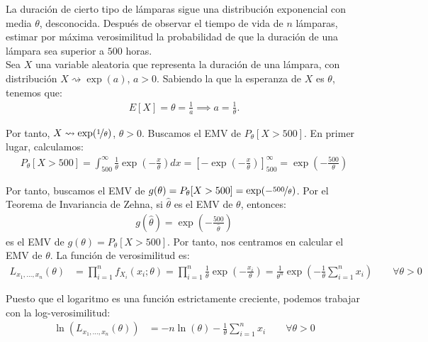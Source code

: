 \begin{ejemplo}
    La duración de cierto tipo de lámparas sigue una distribución exponencial con media $\theta$, desconocida. Después de observar el tiempo de vida de $n$ lámparas, estimar por máxima verosimilitud la probabilidad de que la duración de una lámpara sea superior a $500$ horas.\\

    Sea $X$ una variable aleatoria que representa la duración de una lámpara, con distribución $X \rightsquigarrow \exp(a)$, $a > 0$. Sabiendo la que la esperanza de $X$ es $\theta$, tenemos que:
    \begin{align*}
        E[X] = \theta = \frac{1}{a} \implies a = \frac{1}{\theta}.
    \end{align*}

    Por tanto, $X \rightsquigarrow \exp(\nicefrac{1}{\theta})$, $\theta > 0$. Buscamos el EMV de $P_{\theta}[X > 500]$. En primer lugar, calculamos:
    \begin{align*}
        P_{\theta}[X > 500] = \int_{500}^{\infty} \frac{1}{\theta} \exp\left(-\frac{x}{\theta}\right) dx = \left[-\exp\left(-\frac{x}{\theta}\right)\right]_{500}^{\infty} = \exp\left(-\frac{500}{\theta}\right)
    \end{align*}

    Por tanto, buscamos el EMV de $g(\theta) = P_{\theta}[X > 500] = \exp(-\nicefrac{500}{\theta})$. Por el Teorema de Invariancia de Zehna, si $\hat{\theta}$ es el EMV de $\theta$, entonces:
    \begin{align*}
        g(\hat{\theta}) = \exp\left(-\frac{500}{\hat{\theta}}\right)
    \end{align*}
    es el EMV de $g(\theta) = P_{\theta}[X > 500]$. Por tanto, nos centramos en calcular el EMV de $\theta$. La función de verosimilitud es:
    \begin{align*}
        L_{x_1, \ldots, x_n}(\theta) &= \prod_{i=1}^{n} f_{X_i}(x_i; \theta) = \prod_{i=1}^{n} \frac{1}{\theta} \exp\left(-\frac{x_i}{\theta}\right) = \frac{1}{\theta^n} \exp\left(-\frac{1}{\theta} \sum_{i=1}^{n} x_i\right) \qquad \forall \theta > 0
    \end{align*}

    Puesto que el logaritmo es una función estrictamente creciente, podemos trabajar con la log-verosimilitud:
    \begin{align*}
        \ln(L_{x_1, \ldots, x_n}(\theta)) &= -n\ln(\theta) - \frac{1}{\theta} \sum_{i=1}^{n} x_i \qquad \forall \theta > 0
    \end{align*}


\end{ejemplo}
